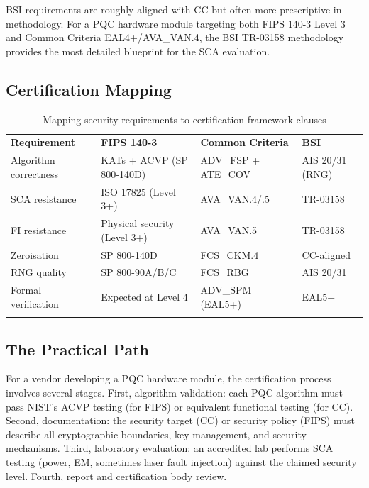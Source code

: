 BSI requirements are roughly aligned with CC but often more prescriptive in methodology.  For a PQC hardware module targeting both FIPS 140-3 Level 3 and Common Criteria EAL4+/AVA\_VAN.4, the BSI TR-03158 methodology provides the most detailed blueprint for the SCA evaluation.

\subsection{Certification Mapping}
\label{subsec:cert-mapping}

\begin{table}[t]
\caption{Mapping security requirements to certification framework clauses}
\label{tab:cert-mapping}
\begin{tabular}{p{2.5cm}p{3.5cm}p{3.5cm}p{2.5cm}}
\hline\noalign{\smallskip}
\textbf{Requirement} & \textbf{FIPS 140-3} & \textbf{Common Criteria} & \textbf{BSI} \\
\noalign{\smallskip}\svhline\noalign{\smallskip}
Algorithm correctness & KATs + ACVP (SP 800-140D) & ADV\_FSP + ATE\_COV & AIS 20/31 (RNG) \\
SCA resistance & ISO 17825 (Level 3+) & AVA\_VAN.4/.5 & TR-03158 \\
FI resistance & Physical security (Level 3+) & AVA\_VAN.5 & TR-03158 \\
Zeroisation & SP 800-140D & FCS\_CKM.4 & CC-aligned \\
RNG quality & SP 800-90A/B/C & FCS\_RBG & AIS 20/31 \\
Formal verification & Expected at Level 4 & ADV\_SPM (EAL5+) & EAL5+ \\
\noalign{\smallskip}\hline
\end{tabular}
\end{table}


\subsection{The Practical Path}
\label{subsec:practical-path}

For a vendor developing a PQC hardware module, the certification process involves several stages.  First, algorithm validation: each PQC algorithm must pass NIST's ACVP testing (for FIPS) or equivalent functional testing (for CC).  Second, documentation: the security target (CC) or security policy (FIPS) must describe all cryptographic boundaries, key management, and security mechanisms.  Third, laboratory evaluation: an accredited lab performs SCA testing (power, EM, sometimes laser fault injection) against the claimed security level.  Fourth, report and certification body review.

